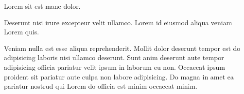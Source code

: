 \documentclass{article}
\begin{document}

Lorem sit est mane  dolor.

Deserunt  nisi irure excepteur velit
ullamco. Lorem id eiusmod aliqua veniam Lorem quis.

Veniam nulla est esse aliqua reprehenderit. Mollit dolor deserunt tempor
est do adipisicing laboris nisi ullamco deserunt. Sunt anim deserunt
aute tempor adipisicing officia pariatur velit ipsum in laborum eu non.
Occaecat ipsum proident sit pariatur aute culpa non labore adipisicing.
Do magna in amet ea pariatur nostrud qui Lorem do officia est minim
occaecat minim.
\end{document}

